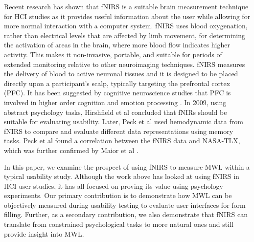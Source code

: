 \documentclass[../main/Feedback.tex]{subfiles}
\begin{document}
Recent research has shown that fNIRS is a suitable brain measurement technique for HCI studies \cite{maior2015examining,pike2014measuring,solovey2009using} as it provides useful information about the user while allowing for more normal interaction with a computer system.
fNIRS uses blood oxygenation, rather than electrical levels that are affected by limb movement, for determining the activation of areas in the brain, where more blood flow indicates higher activity.
This makes it non-invasive, portable, and suitable for periods of extended monitoring relative to other neuroimaging techniques.
fNIRS measures the delivery of blood to active neuronal tissues and it is designed to be placed directly upon a participant's scalp, typically targeting the prefrontal cortex (PFC).
It has been suggested by cognitive neuroscience studies that PFC is involved in higher order cognition \cite{braver1997parametric} and emotion processing \cite{damasio1996somatic}. In 2009, using abstract psychology tasks, Hirshfield et al \cite{hirshfield2009brain} concluded that fNIRs should be suitable for evaluating usability. Later, Peck et al \cite{peck2013using} used hemodynamic data from fNIRS to compare and evaluate different data representations using memory tasks.
Peck et al found a correlation between the fNIRS data and NASA-TLX, which was further confirmed by Maior et al \cite{maior2014continuous}.

In this paper, we examine the prospect of using fNIRS to measure MWL within a typical usability study. Although the work above has looked at using fNIRS in HCI user studies, it has all focused on proving its value using psychology experiments. Our primary contribution is to demonstrate how MWL can be objectively measured during usability testing to evaluate user interfaces for form filling. Further, as a secondary contribution, we also demonstrate that fNIRS can translate from constrained psychological tasks to more natural ones and still provide insight into MWL.
\end{document}
